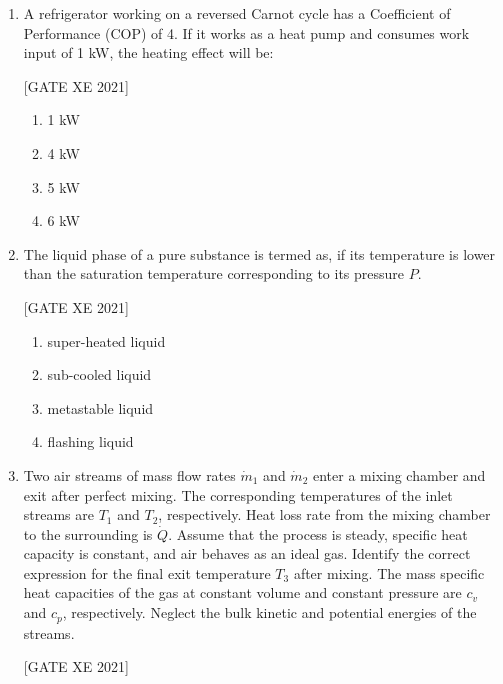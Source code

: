 \documentclass[journal,12pt,onecolumn]{IEEEtran}
\theoremstyle{remark}
\begin{document}
\begin{enumerate}[resume]
\hfill[GATE XE 2021]
\item A refrigerator working on a reversed Carnot cycle has a Coefficient of Performance (COP) of 4. If it works as a heat pump and consumes work input of 1 kW, the heating effect will be:

\hfill[GATE XE 2021]

\begin{multicols}{2}
\begin{enumerate}
\item 1 kW
\item 4 kW
\item 5 kW
\item 6 kW
\end{enumerate}
\end{multicols}


\item The liquid phase of a pure substance is termed as, if its temperature is lower than the saturation temperature corresponding to its pressure $P$.

\hfill[GATE XE 2021]

\begin{multicols}{2}
\begin{enumerate}
\item super-heated liquid
\item sub-cooled liquid
\item metastable liquid
\item flashing liquid
\end{enumerate}
\end{multicols}

\item Two air streams of mass flow rates $\dot{m}_1$ and $\dot{m}_2$ enter a mixing chamber and exit after perfect mixing. The corresponding temperatures of the inlet streams are $T_1$ and $T_2$, respectively. Heat loss rate from the mixing chamber to the surrounding is $\dot{Q}$. Assume that the process is steady, specific heat capacity is constant, and air behaves as an ideal gas. Identify the correct expression for the final exit temperature $T_3$ after mixing. The mass specific heat capacities of the gas at constant volume and constant pressure are $c_v$ and $c_p$, respectively. Neglect the bulk kinetic and potential energies of the streams.

\hfill[GATE XE 2021]


\end{enumerate}
\end{document}
